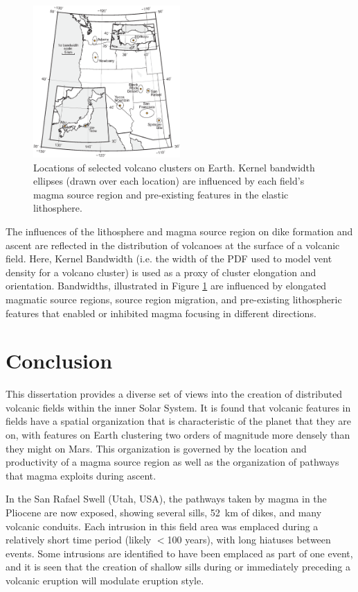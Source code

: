 \begin{figure}
\centering
\includegraphics[width=0.5\textwidth]{figures/chapter-spatial_density/locators/earth_locator.eps}
\caption{Locations of selected volcano clusters on Earth. Kernel bandwidth ellipses (drawn over each location) are influenced by each field's magma source region and pre-existing features in the elastic lithosphere.}
\label{fig_earthlocator}
\end{figure}

The influences of the lithosphere and magma source region on dike formation and ascent are reflected in the distribution of volcanoes at the surface of a volcanic field. Here, Kernel Bandwidth (i.e. the width of the PDF used to model vent density for a volcano cluster) is used as a proxy of cluster elongation and orientation. Bandwidths, illustrated in Figure \ref{fig_earthlocator} are influenced by elongated magmatic source regions, source region migration, and pre-existing lithospheric features that enabled or inhibited magma focusing in different directions.

\clearpage
\section{Conclusion}

This dissertation provides a diverse set of views into the creation of distributed volcanic fields within the inner Solar System. It is found that volcanic features in fields have a spatial organization that is characteristic of the planet that they are on, with features on Earth clustering two orders of magnitude more densely than they might on Mars. This organization is governed by the location and productivity of a magma source region as well as the organization of pathways that magma exploits during ascent.

In the San Rafael Swell (Utah, USA), the pathways taken by magma in the Pliocene are now exposed, showing several sills, 52~km of dikes, and many volcanic conduits. Each intrusion in this field area was emplaced during a relatively short time period (likely $<$100 years), with long hiatuses between events. Some intrusions are identified to have been emplaced as part of one event, and it is seen that the creation of shallow sills during or immediately preceding a volcanic eruption will modulate eruption style.

